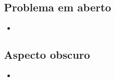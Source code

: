 \subsection{Problema em aberto}
 \begin{itemize}
   \item 
 \end{itemize}  

\subsection{Aspecto obscuro}
 \begin{itemize}
   \item
 \end{itemize}  